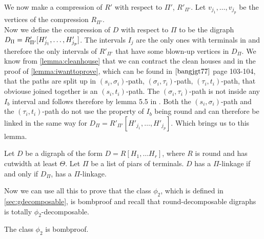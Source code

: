 We now make a compression of $R'$ with respect to $\Pi'$, $R'_{\Pi'}$. 
Let $v_{j_1},\dots ,v_{j_p}$ be the vertices of the compression $R_{\Pi'}$.\\
Now we define the compression of $D$ with respect to $\Pi$ to be the digraph $D_\Pi = R'_{\Pi'}[H'_{j_1},\dots \\ ,H'_{j_p}]$.
The intervals $I_j$ are the only ones with terminals in and therefore the only intervals of $R'_{\Pi'}$ that have some blown-up vertices in $D_\Pi$.
We know from \autoref{lemma:cleanhouse} that we can contract the clean houses and in the proof of \autoref{lemma:iwanttoprove}, which can be found in $\cite{bangjgt77}$ page 103-104, that the paths are split up in $(s_i,\sigma _i)$-path, $(\sigma_i,\tau_i)$-path, $(\tau_i,t_i)$-path, that obviouse joined together is an $(s_i,t_i)$-path. 
The $(\sigma_i,\tau_i)$-path is not inside any $I_b$ interval and follows therefore by lemma 5.5 in \cite{bangJGT77}. 
Both the $(s_i, \sigma_i)$-path and the $(\tau_i,t_i)$-path do not use the property of $I_b$ being round and can therefore be linked in the same way for $D_\Pi=R'_{\Pi'}[H'_{j_1},\dots ,H'_{j_p}]$. 
Which brings us to this lemma.
\begin{lemma}
    Let $D$ be a digraph of the form $D=R[H_1,\dots H_r]$, where $R$ is round and has cutwidth at least $\Theta$. Let $\Pi$ be a list of piars of terminals. $D$ has a $\Pi$-linkage if and only if $D_\Pi$, has a $\Pi$-linkage.
    \label{lemma:compressiondecom}
\end{lemma}
Now we can use all this to prove that the class $\phi_2$, which is defined in \autoref{sec:gdecomposable}, is bombproof and recall that round-decomposable digraphs is totally $\phi_2$-decomposable.
\begin{lemma}
    The class $\phi_2$ is bombproof.
\end{lemma}
